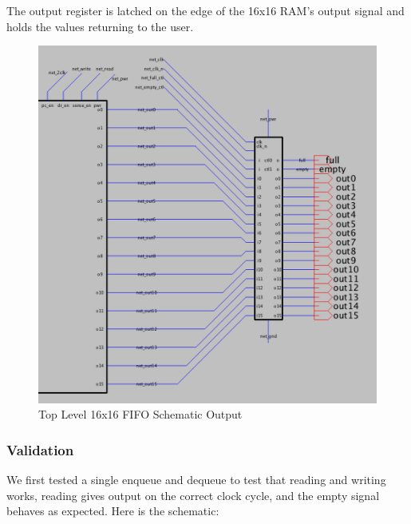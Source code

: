 \documentclass[a4paper]{article}
\begin{document}
The output register is latched on the edge of the 16x16 RAM's output signal and holds the values returning to the user.

\begin{figure}[H]
	\centering
	\includegraphics[scale=0.4]{topLevelSchematicRight}
	\caption{Top Level 16x16 FIFO Schematic Output}
	\label{fig:topLevelSchematicRight}
\end{figure}

\subsubsection{Validation}

We first tested a single enqueue and dequeue to test that reading and writing works, reading gives output on the correct clock cycle, and the empty signal behaves as expected. Here is the schematic:
\end{document}
